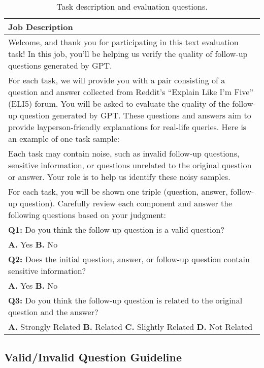 \begin{table}[H]
    \scriptsize
    \centering
    \begin{tabular}{ p{\columnwidth} }
        \toprule
        \textbf{Job Description} \\
        \midrule
        Welcome, and thank you for participating in this text evaluation task! In this job, you'll be helping us verify the quality of follow-up questions generated by GPT.\\
        For each task, we will provide you with a pair consisting of a question and answer collected from Reddit's ``Explain Like I'm Five” (ELI5) forum. You will be asked to evaluate the quality of the follow-up question generated by GPT. These questions and answers aim to provide layperson-friendly explanations for real-life queries. Here is an example of one task sample: \\
        Each task may contain noise, such as invalid follow-up questions, sensitive information, or questions unrelated to the original question or answer. Your role is to help us identify these noisy samples.\\
        For each task, you will be shown one triple (question, answer, follow-up question). Carefully review each component and answer the following questions based on your judgment: \\
        \midrule
        \textbf{Q1:} Do you think the follow-up question is a valid question? \\
        \textbf{A.} Yes \quad
        \textbf{B.} No \\
        \midrule
        \textbf{Q2:} Does the initial question, answer, or follow-up question contain sensitive information? \\
        \textbf{A.} Yes \quad
        \textbf{B.} No \\
        \midrule
        \textbf{Q3:} Do you think the follow-up question is related to the original question and the answer? \\
        \textbf{A.} Strongly Related \quad
        \textbf{B.} Related \quad
        \textbf{C.} Slightly Related \quad
        \textbf{D.} Not Related \\
        \bottomrule
    \end{tabular}
    \caption{Task description and evaluation questions.}
    \label{tab:task_description_GPT}
\end{table}

\subsection{Valid/Invalid Question Guideline}

